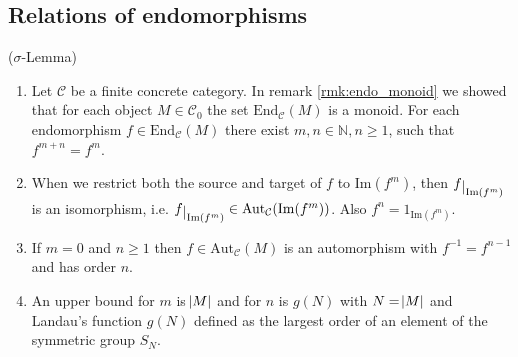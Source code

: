 %
\noindent\begin{minipage}[t]{.55\textwidth}\vspace{0pt}%
\subsection{Relations of endomorphisms}
\begin{lemma}{($\sigma$-Lemma)}\label{la:sigma-lemma}
\begin{enumerate}
\renewcommand{\labelenumi}{(\theenumi)}
\item Let $\mathcal{C}$ be a finite concrete category. In remark \ref{rmk:endo_monoid} we showed that for each object
$M \in \mathcal{C}_{0}$ the set $\mathrm{End}_{\mathcal{C}}(M)$ is a monoid. For each endomorphism $f \in \mathrm{End}_{\mathcal{C}}(M)$
there exist $m,n \in \mathbb{N}, n\geq 1$, such that $f^{m+n}=f^{m}$.
\item When we restrict both the source and target of $f$ to $\mathrm{Im}(f^{m})$, then $f\restrict{\mathrm{Im}(f^{m})}$ is an isomorphism, i.e.
$f\restrict{\mathrm{Im}(f^{m})} \in \mathrm{Aut}_{\mathcal{C}}(\mathrm{Im}(f^{m}))$. Also $f^{n} = 1_{\mathrm{Im}(f^{m})}$.
\item If $m = 0$ and $n \geq 1$ then $f \in \mathrm{Aut}_{\mathcal{C}}(M)$ is an automorphism with $f^{-1} = f^{n-1}$ and has order $n$.
\item An upper bound for $m$ is $\abs{M}$ and for $n$ is $g(N)$ with $N = \abs{M}$ and Landau's function $g(N)$
defined as the largest order of an element of the symmetric group $S_{N}$.
\end{enumerate}
\end{lemma}
\noindent
\begin{minipage}[b]{.45\textwidth}
\end{minipage}
\end{minipage}
